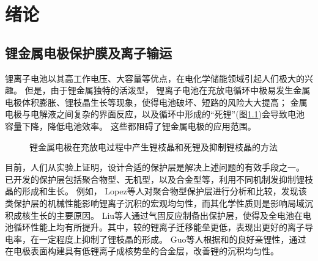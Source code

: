 \chapter{绪论}
\section{锂金属电极保护膜及离子输运}

锂离子电池以其高工作电压、大容量等优点，在电化学储能领域引起人们极大的兴趣。
但是，由于锂金属独特的活泼型，
锂离子电池在充放电循环中极易发生金属电极体积膨胀、锂枝晶生长等现象，使得电池破坏、短路的风险大大提高；
金属电极与电解液之间复杂的界面反应，以及循环中形成的“死锂”(图\ref{fig:Li-anode})会导致电池容量下降，降低电池效率。
这些都阻碍了锂金属电极的应用范围。

\begin{figure}[htbp]
    \centering
    \caption{锂金属电极在充放电过程中产生锂枝晶和死锂及抑制锂枝晶的方法}
    \label{fig:Li-anode}
\end{figure}

目前，人们从实验上证明，设计合适的保护层是解决上述问题的有效手段之一。
已开发的保护层包括聚合物型、无机型，以及合金型等，利用不同机制发抑制锂枝晶的形成和生长。
例如， Lopez等人对聚合物型保护层进行分析和比较，发现该类保护层的机械性能影响锂离子沉积的宏观均匀性，而其化学性质则是影响局域沉积成核生长的主要原因。
Liu等人通过气固反应制备出保护层，使得及全电池在电池循环性能上均有所提升。其中，较的锂离子迁移能垒更低，表现出更好的离子导电率，在一定程度上抑制了锂枝晶的形成。
Guo等人根据和的良好亲锂性，通过在电极表面构建具有低锂离子成核势垒的合金层，改善锂的沉积均匀性。

